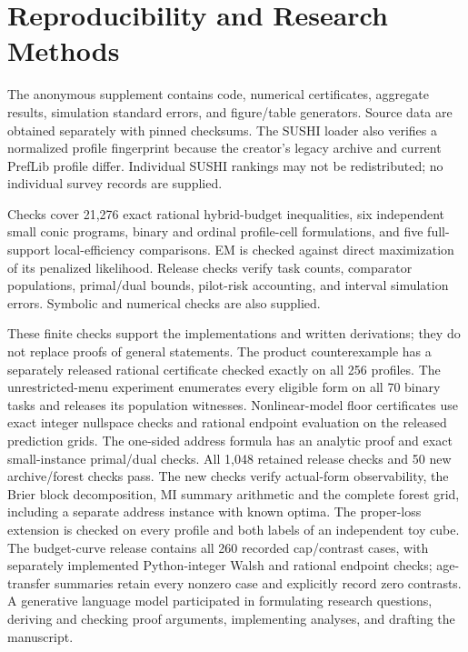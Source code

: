 \section{Reproducibility and Research Methods}
The anonymous supplement contains code, numerical certificates, aggregate
results, simulation standard errors, and figure/table generators. Source data
are obtained separately with pinned checksums. The SUSHI loader also verifies
a normalized profile fingerprint because the creator's legacy archive and
current PrefLib profile differ. Individual SUSHI rankings may not be
redistributed; no individual survey records are supplied.

Checks cover 21,276 exact rational hybrid-budget inequalities, six independent
small conic programs, binary and ordinal profile-cell formulations, and five
full-support local-efficiency comparisons. EM is checked against direct
maximization of its penalized likelihood. Release checks verify task counts,
comparator populations, primal/dual bounds, pilot-risk accounting, and
interval simulation errors. Symbolic and numerical checks are also supplied.

These finite checks support the implementations and written derivations;
they do not replace proofs of general statements. The product counterexample
has a separately released rational certificate checked exactly on all 256
profiles. The unrestricted-menu experiment enumerates every eligible form
on all 70 binary tasks and releases its population witnesses. Nonlinear-model
floor certificates use exact integer nullspace checks and rational endpoint
evaluation on the released prediction grids. The one-sided address formula
has an analytic proof and exact small-instance primal/dual checks.
All 1,048 retained release checks and 50 new archive/forest checks pass.
The new checks verify actual-form observability, the Brier block
decomposition, MI summary arithmetic and the complete forest grid,
including a separate address instance with known optima. The proper-loss extension is
checked on every profile and both labels of
an independent toy cube. The budget-curve release contains all 260
recorded cap/contrast cases, with separately implemented Python-integer
Walsh and rational endpoint checks; age-transfer summaries retain every
nonzero case and explicitly record zero contrasts.
A generative language
model participated in formulating research questions, deriving and checking
proof arguments, implementing analyses, and drafting the manuscript.
